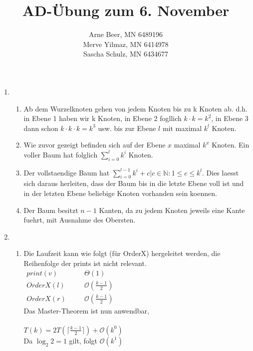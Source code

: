 \documentclass{article}
\title{AD-Übung zum 6. November}
\author{Arne Beer, MN 6489196\\
Merve Yilmaz, MN 6414978\\
Sascha Schulz, MN 6434677}
\begin{document}
\maketitle

\begin{enumerate}[\bfseries1.]
    \item
        \begin{enumerate}
            \item
                Ab dem Wurzelknoten gehen von jedem Knoten bis zu k Knoten ab.
                d.h. in Ebene 1 haben wir k Knoten, in Ebene 2 fogllich $k\cdot k =
                k^2$, in Ebene 3 dann schon $k\cdot k\cdot k = k^3$ usw. bis zur Ebene
                $l$ mit maximal $k^l$ Knoten.
            
            \item
                Wie zuvor gezeigt befinden sich auf der Ebene $x$ maximal $k^x$
                Knoten. Ein voller Baum hat folglich $\sum\limits_{i=0}^l k^i$ Knoten.
                
            \item 
                Der vollstaendige Baum hat $\sum\limits_{i=0}^{l-1} k^i + c | c \in \mathbb{N} :1 \leq c \leq k^l$. Dies laesst sich daraus herleiten, dass der Baum bis in die letzte Ebene voll ist und in der letzten Ebene beliebige Knoten vorhanden sein koennen.
            \item 
                Der Baum besitzt $n-1$ Kanten, da zu jedem Knoten jeweils eine Kante fuehrt, mit Ausnahme des Obersten.
        \end{enumerate}

    \item
        \begin{enumerate}
            \item
                Die Laufzeit kann wie folgt (für OrderX) hergeleitet werden, die Reihenfolge der prints ist nicht relevant.\\
                \(
                \begin{array}{lll}
                        print(v) &\quad & \Theta(1) \\
                        OrderX(l) &\quad & \mathcal{O}(\frac{k-1}{2}) \\
                        OrderX(r) &\quad & \mathcal{O}(\frac{k-1}{2})
                \end{array}
                \) \\
                Das Master-Theorem ist nun anwendbar, \\ \\
                \(T(k)=2T(\big\lceil\frac{ k-1}{2}\big\rceil)+\mathcal{O}(k^0)\) \\
                Da \(\log_2 2 = 1\) gilt, folgt \(\mathcal{O}(k^1)\)
                                

\end{enumerate}
\end{enumerate}
\end{document}
